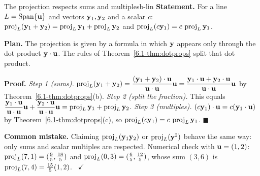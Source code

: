 \documentclass[11pt]{article}
\begin{document}
\begin{exmp}{The projection respects sums and multiples}{b-lin}
\textbf{Statement.} For a line $L=\operatorname{Span}\{\mathbf{u}\}$ and vectors $\mathbf{y}_1,\mathbf{y}_2$ and a scalar $c$: $\operatorname{proj}_L(\mathbf{y}_1+\mathbf{y}_2)=\operatorname{proj}_L\mathbf{y}_1+\operatorname{proj}_L\mathbf{y}_2$ and $\operatorname{proj}_L(c\mathbf{y}_1)=c\,\operatorname{proj}_L\mathbf{y}_1$.

\textbf{Plan.} The projection is given by a formula in which $\mathbf{y}$ appears only through the dot product $\mathbf{y}\cdot\mathbf{u}$. The rules of Theorem~\ref{6.1-thm:dotprops} split that dot product.

\textbf{Proof.}
\emph{Step 1 (sums).} $\operatorname{proj}_L(\mathbf{y}_1+\mathbf{y}_2)=\dfrac{(\mathbf{y}_1+\mathbf{y}_2)\cdot\mathbf{u}}{\mathbf{u}\cdot\mathbf{u}}\mathbf{u}=\dfrac{\mathbf{y}_1\cdot\mathbf{u}+\mathbf{y}_2\cdot\mathbf{u}}{\mathbf{u}\cdot\mathbf{u}}\mathbf{u}$ by Theorem~\ref{6.1-thm:dotprops}(b).
\emph{Step 2 (split the fraction).} This equals $\dfrac{\mathbf{y}_1\cdot\mathbf{u}}{\mathbf{u}\cdot\mathbf{u}}\mathbf{u}+\dfrac{\mathbf{y}_2\cdot\mathbf{u}}{\mathbf{u}\cdot\mathbf{u}}\mathbf{u}=\operatorname{proj}_L\mathbf{y}_1+\operatorname{proj}_L\mathbf{y}_2$.
\emph{Step 3 (multiples).} $(c\mathbf{y}_1)\cdot\mathbf{u}=c(\mathbf{y}_1\cdot\mathbf{u})$ by Theorem~\ref{6.1-thm:dotprops}(c), so $\operatorname{proj}_L(c\mathbf{y}_1)=c\,\operatorname{proj}_L\mathbf{y}_1$. \qquad$\blacksquare$

\textbf{Common mistake.} Claiming $\operatorname{proj}_L(\mathbf{y}_1\mathbf{y}_2)$ or $\operatorname{proj}_L(\mathbf{y}^2)$ behave the same way: only sums and scalar multiples are respected. Numerical check with $\mathbf{u}=(1,2)$: $\operatorname{proj}_L(7,1)=(\tfrac95,\tfrac{18}5)$ and $\operatorname{proj}_L(0,3)=(\tfrac65,\tfrac{12}5)$, whose sum $(3,6)$ is $\operatorname{proj}_L(7,4)=\tfrac{15}{5}(1,2)$. \ $\checkmark$
\end{exmp}
\end{document}
